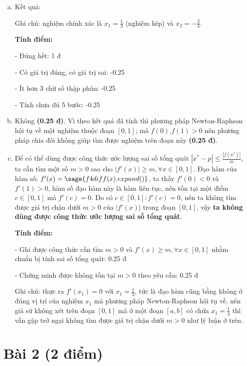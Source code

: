 \documentclass[12pt]{article}
\begin{document}
\begin{enumerate}[a).]
\item Kết quả:

\begin{center}  \end{center}

Ghi chú: nghiệm chính xác là $x_1=\frac{1}{3}$ (nghiệm kép) và $x_2=-\frac{2}{3}$.

\textbf{Tính điểm:} 

- Đúng hết: 1 đ

- Có giá trị đúng, có giá trị sai: -0.25

- Ít hơn 3 chữ số thập phân: -0.25

- Tính chưa đủ 5 bước: -0.25

\item Không \textbf{(0.25 đ)}. Vì theo kết quả đã tính thì phương pháp Newton-Raphson hội tụ về một nghiệm thuộc đoạn $[0,1]$; mà $f(0).f(1)>0$ nên phương pháp chia đôi không giúp tìm được nghiệm trên đoạn này \textbf{(0.25 đ)}.

\item  Để có thể dùng được công thức ước lượng sai số tổng quát $|x^* - p| \leq \frac{|f(x^*)|}{m}$, ta cần tìm một số $m>0$ sao cho $|f'(x)| \geq m, \forall x \in [0,1]$. Đạo hàm của hàm số: $f'(x)=\sage{f4diff(x).expand()}$, ta thấy $f'(0)<0$ và $f'(1)>0$, hàm số đạo hàm này là hàm liên tục, nên tồn tại một điểm $c \in [0,1]$ mà $f'(c)=0$. Do có $c \in [0,1]: f'(c)=0$, nên ta không tìm được giá trị chặn dưới $m>0$ của $|f'(x)|$ trong đoạn $[0,1]$, vậy \textbf{ta không dùng được công thức ước lượng sai số tổng quát}.

\textbf{Tính điểm:} 

- Ghi được công thức cần tìm $m>0$ và $f'(x) \geq m, \forall x \in [0,1]$ nhằm chuẩn bị tính sai số tổng quát: 0.25 đ

- Chứng minh được không tồn tại $m>0$ theo yêu cầu: 0.25 đ

Ghi chú: thực ra $f'(x_1)=0$ với $x_1=\frac{1}{3}$, tức là đạo hàm cũng bằng không ở đúng vị trí của nghiệm $x_1$ mà phương pháp Newton-Raphson hội tụ về, nên giả sử không xét trên đoạn $[0,1]$ mà ở một đoạn $[a,b]$ có chứa $x_1=\frac{1}{3}$ thì vẫn gặp trở ngại không tìm được giá trị chặn dưới $m>0$ như lý luận ở trên.
\end{enumerate}

\section{Bài 2 (2 điểm)}
\end{document}
